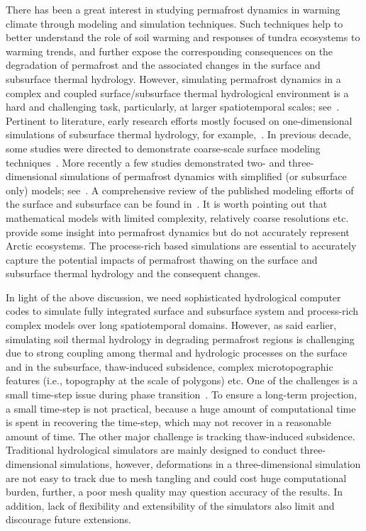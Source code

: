 \documentclass[review]{elsarticle}
\begin{document}
There has been a great interest in studying permafrost dynamics in warming climate through modeling and simulation techniques. Such techniques help to better understand the role of soil warming and responses of tundra ecosystems to warming trends, and further expose the corresponding consequences on the degradation of permafrost and the associated changes in the surface and subsurface thermal hydrology. However, simulating permafrost dynamics in a complex and coupled surface/subsurface thermal hydrological environment is a hard and challenging task, particularly, at larger spatiotemporal scales; see~\cite{painter2013modeling}. Pertinent to literature, early research efforts mostly focused on one-dimensional simulations of subsurface thermal hydrology, for example,~\cite{harlan1973analysis, guymon1974coupled, taylor1978model}. In previous decade, some studies were directed to demonstrate coarse-scale surface modeling techniques~\cite{takata2003development, nicolsky2007improved, mckenzie2007groundwater}. More recently a few studies demonstrated two- and three-dimensional simulations of permafrost dynamics with simplified (or subsurface only) models; see~\cite{bense2009evolution, lawrence2012simulation, koven2013analysis, karra2014three}. A comprehensive review of the published modeling efforts of the surface and subsurface can be found in~\cite{kurylyk2014climate}. It is worth pointing out that mathematical models with limited complexity, relatively coarse resolutions etc. provide some insight into permafrost dynamics but do not accurately represent Arctic ecosystems. The process-rich based simulations are essential to accurately capture the potential impacts of permafrost thawing on the surface and subsurface thermal hydrology and the consequent changes.

In light of the above discussion, we need sophisticated hydrological computer codes to simulate fully integrated surface and subsurface system and process-rich complex models over long spatiotemporal domains. However, as said earlier, simulating soil thermal hydrology in degrading permafrost regions is challenging due to strong coupling among thermal and hydrologic processes on the surface and in the subsurface, thaw-induced subsidence, complex microtopographic features (i.e., topography at the scale of polygons) etc. One of the challenges is a small time-step issue during phase transition~\cite{dall2011robust}. To ensure a long-term projection, a small time-step is not practical, because a huge amount of computational time is spent in recovering the time-step, which may not recover in a reasonable amount of time. The other major challenge is tracking thaw-induced subsidence. Traditional hydrological simulators are mainly designed to conduct three-dimensional simulations, however, deformations in a three-dimensional simulation are not easy to track due to mesh tangling and could cost huge computational burden, further, a poor mesh quality may question accuracy of the results. In addition, lack of flexibility and extensibility of the simulators also limit and discourage future extensions.
\end{document}
